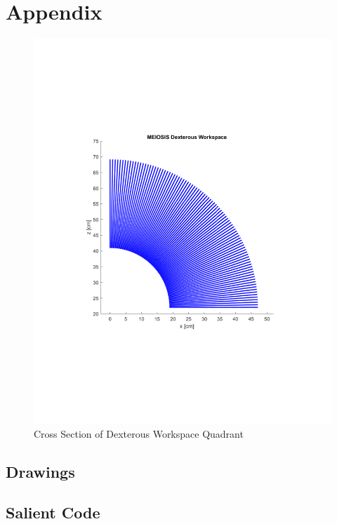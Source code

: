 \documentclass[12pt]{report}
\begin{document}
\section{Appendix}\label{sec:app}
\begin{figure}[htp]
  \centering
  \includegraphics[frame,width=.75\textwidth]{dex}
  \caption{Cross Section of Dexterous Workspace Quadrant}
  \label{fig:dex}
\end{figure}
\subsection{Drawings}
\subsection{Salient Code}
% 

\newpage


\end{document}
